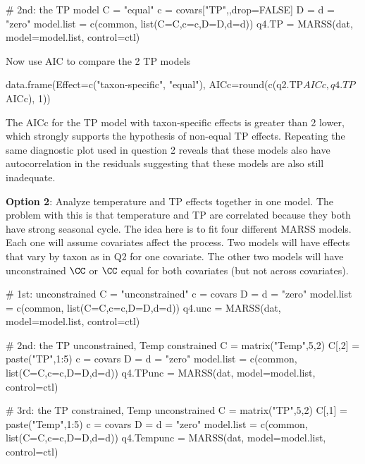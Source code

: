 \begin{Schunk}
\begin{Sinput}
 # 2nd: the TP model
 C = "equal"
 c = covars["TP",,drop=FALSE]
 D = d = "zero"
 model.list = c(common, list(C=C,c=c,D=D,d=d))
 q4.TP = MARSS(dat, model=model.list, control=ctl)
\end{Sinput}
\end{Schunk}
Now use AIC to compare the 2 TP models
\begin{Schunk}
\begin{Sinput}
 data.frame(Effect=c("taxon-specific", "equal"),
 		   AICc=round(c(q2.TP$AICc, q4.TP$AICc), 1))
\end{Sinput}
\end{Schunk}

The AICc for the TP model with taxon-specific effects is greater than 2
lower, which
strongly supports the hypothesis of non-equal TP effects. Repeating the same diagnostic plot used in question 2 reveals that these models also have autocorrelation in the residuals suggesting that these models are also still inadequate.

\bigskip
{\bf Option 2}:  Analyze temperature and TP effects together in one model.  The problem with this is that temperature and TP are correlated because they both have strong seasonal cycle.  The idea here is to fit four different MARSS models.
Each one will assume covariates affect the process. Two models will have
effects that vary by taxon as in Q2 for one covariate.  The other two models will have unconstrained $\CC$ or $\CC$ equal for both covariates (but not across covariates).

\begin{Schunk}
\begin{Sinput}
 # 1st: unconstrained
 C = "unconstrained"
 c = covars
 D = d = "zero"
 model.list = c(common, list(C=C,c=c,D=D,d=d))
 q4.unc = MARSS(dat, model=model.list, control=ctl)
\end{Sinput}
\end{Schunk}

\begin{Schunk}
\begin{Sinput}
 # 2nd: the TP unconstrained, Temp constrained
 C = matrix("Temp",5,2)
 C[,2] = paste("TP",1:5)
 c = covars
 D = d = "zero"
 model.list = c(common, list(C=C,c=c,D=D,d=d))
 q4.TPunc = MARSS(dat, model=model.list, control=ctl)
\end{Sinput}
\end{Schunk}

\begin{Schunk}
\begin{Sinput}
 # 3rd: the TP constrained, Temp unconstrained
 C = matrix("TP",5,2)
 C[,1] = paste("Temp",1:5)
 c = covars
 D = d = "zero"
 model.list = c(common, list(C=C,c=c,D=D,d=d))
 q4.Tempunc = MARSS(dat, model=model.list, control=ctl)
\end{Sinput}
\end{Schunk}

